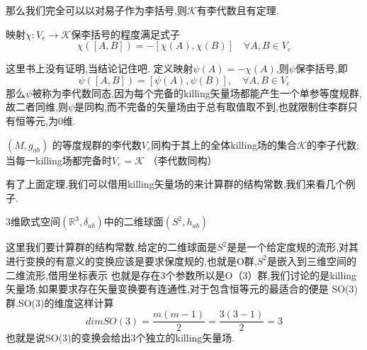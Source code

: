 \documentclass[../main.tex]{subfiles}
\begin{document}
那么我们完全可以以对易子作为李括号,则$\mathscr{K}$有李代数且有定理.\begin{theorem}
	映射$\chi:V_e \rightarrow \mathscr{K}$保李括号的程度满足式子$$
		\chi([A,B]) = -[\chi(A),\chi(B)]\quad \forall A,B \in V_e$$
\end{theorem}
这里书上没有证明,当结论记住吧.
定义映射$\psi (A) = - \chi(A)$,则$\psi$保李括号,即$$
	\psi([A,B]) = [\psi(A),\psi(B)],\quad \forall A,B \in V_e $$
那么$\psi$被称为李代数同态,因为每个完备的killing矢量场都能产生一个单参等度规群,故二者同维,则$\psi $是同构,而不完备的矢量场由于总有取值取不到,也就限制住李群只有恒等元,为0维.
\begin{theorem}
	$(M,g_{ab})$ 的等度规群的李代数$V_e$同构于其上的全体killing场的集合$\mathscr{K}$的李子代数;当每一killing场都完备时$V_e = \mathscr{K}$
	（李代数同构）
\end{theorem}
有了上面定理,我们可以借用killing矢量场的来计算群的结构常数,我们来看几个例子.
\begin{example}
  \label{ex:G-7-1}
	3维欧式空间$(\mathbb{R}^3,\delta_{ab})$中的二维球面$(S^2,h_{ab})$
\end{example}
这里我们要计算群的结构常数,给定的二维球面是$S^2 $是是一个给定度规的流形,对其进行变换的有意义的变换应该是要求保度规的,也就是O群,$S^2 $是嵌入到三维空间的二维流形,借用坐标表示
也就是存在3个参数所以是O（3）群,我们讨论的是killing矢量场,如果要求存在矢量变换要有连通性,对于包含恒等元的最适合的便是
SO(3)群.SO(3)的维度这样计算$$
	dim SO(3) = \frac{m(m-1)}{2}=\frac{3(3-1)}{2}= 3$$
也就是说SO(3)的变换会给出3个独立的killing矢量场.
\end{document}

